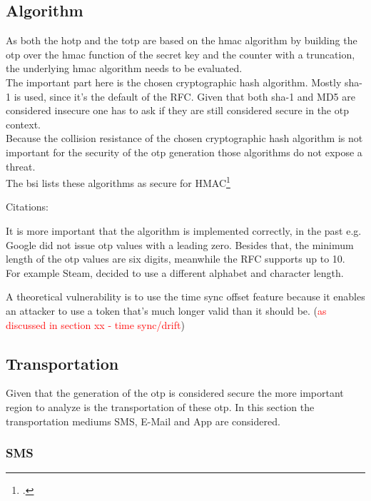 \subsection{Algorithm}

As both the \gls{hotp} and the \gls{totp} are based on the \gls{hmac} algorithm by building the \gls{otp} over the \gls{hmac} function of the secret key and the counter with a truncation, the underlying \gls{hmac} algorithm needs to be evaluated.\\
The important part here is the chosen cryptographic hash algorithm. Mostly \gls{sha}-1 is used, since it's the default of the RFC. Given that both \gls{sha}-1 and MD5 are considered insecure one has to ask if they are still considered secure in the \gls{otp} context.\\
Because the collision resistance of the chosen cryptographic hash algorithm is not important for the security of the \gls{otp} generation those algorithms do not expose a threat.\\
The \gls{bsi} lists these algorithms as secure for HMAC\footcite{verfahren2019empfehlungen}

Citations: \cite{}

It is more important that the algorithm is implemented correctly, in the past e.g. Google did not issue \gls{otp} values with a leading zero. Besides that, the minimum length of the \gls{otp} values are six digits, meanwhile the RFC supports up to 10.\\
For example Steam, decided to use a different alphabet and character length.

A theoretical vulnerability is to use the time sync offset feature because it enables an attacker to use a token that's much longer valid than it should be. (\textcolor{red}{as discussed in section xx - time sync/drift})

\subsection{Transportation}

Given that the generation of the \gls{otp} is considered secure the more important region to analyze is the transportation of these \gls{otp}. In this section the transportation mediums SMS, E-Mail and App are considered.

\subsubsection{SMS}

